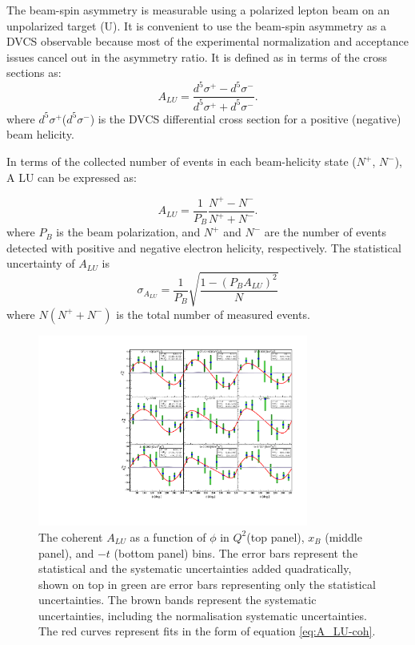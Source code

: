 \documentclass[nofootinbib,twocolumn,showpacs,prl,superscriptaddress,secnumarabic,amssymb,nobibnotes,aps,floatfix]{revtex4}
\begin{document}
The beam-spin asymmetry is measurable using a polarized lepton beam on an 
unpolarized target (U). It is convenient to use the beam-spin asymmetry as a 
DVCS observable because most of the experimental normalization and acceptance 
issues cancel out in the asymmetry ratio. It is defined as in terms of the 
cross sections as:
  \begin{equation}
  A_{LU} = \frac{d^{5}\sigma^{+} - d^{5}\sigma^{-} }
                {d^{5}\sigma^{+} + d^{5}\sigma^{-}}.
    \label{BSA_equation}
  \end{equation}
  where $d^{5}\sigma^{+}$($d^{5}\sigma^{-}$) is the DVCS differential cross section for a positive (negative) beam helicity.




In terms of the collected number of events in each beam-helicity state 
($N^{+}$, $N^{-}$), A LU can be
expressed as:

\begin{equation}
A_{LU} = \frac{1}{P_{B}} \frac{N^{+} - N^{-}}{N^{+} + N^{-} }.
\end{equation}
%
where $P_{B}$ is the beam polarization, and $N^{+}$ and $N^{-}$ are the number of events detected with positive and negative electron helicity, respectively. The statistical uncertainty of $A_{LU}$ is
%
\begin{equation}
   \sigma_{A_{LU}} = \frac{1}{P_{B}} \sqrt{ \frac{1 - (P_{B}A_{LU})^{2}}{N}}
\end{equation}
%
where $N (N^{+} + N^{-}) $ is the total number of measured events.
%


\begin{figure}[tb]
\includegraphics[width=8.9cm]{figs/coherent-ALU.pdf}
\caption{The coherent $A_{LU}$ as a function of $\phi$ in
   $Q^{2}$(top panel), $x_{B}$ (middle panel), and $-t$ (bottom panel) bins.  
   The error bars represent the statistical and the systematic uncertainties 
   added quadratically, shown on top in green are error bars representing only 
   the statistical uncertainties. The brown bands represent the systematic
uncertainties, including the normalisation systematic uncertainties. The red
curves represent fits in the form of equation \ref{eq:A_LU-coh}.}
\label{fig:alu}
\end{figure}
\end{document}
